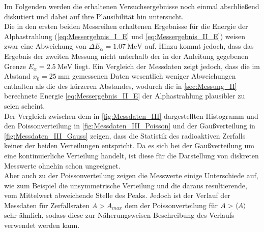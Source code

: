 Im Folgenden werden die erhaltenen Versuchsergebnisse noch einmal
abschließend diskutiert und dabei auf ihre Plausibilität hin untersucht.\\

Die in den ersten beiden Messreihen erhaltenen Ergebnisse für die 
Energie der Alphastrahlung (\cref{eq:Messergebnis_I_E} und \cref{eq:Messergebnis_II_E})
weisen zwar eine Abweichung von $\Delta E_{\alpha} = \SI{1.07}{\mega\eV}$ auf. 
Hinzu kommt jedoch, dass das Ergebnis der zweiten Messung nicht unterhalb der
in der Anleitung \cite{V701} gegebenen Grenze $E_{\alpha} = \SI{2.5}{\mega\eV}$ liegt.
Ein Vergleich der Messdaten zeigt jedoch, dass die im Abstand $x_{0} = \SI{25}{\milli\meter}$ 
gemessenen Daten wesentlich weniger Abweichungen enthalten als die des kürzeren Abstandes,
wodurch die in \cref{sec:Messung_II}  berechnete Energie \cref{eq:Messergebnis_II_E} 
der Alphastrahlung plausibler zu seien scheint. \\

Der Vergleich zwischen dem in \cref{fig:Messdaten_III} dargestellten Histogramm und 
den Poissonverteilung in \cref{fig:Messdaten_III_Poisson} und der Gaußverteilung in
\cref{fig:Messdaten_III_Gauss} zeigen, dass die Statistik des radioaktiven Zerfalls
keiner der beiden Verteilungen entspricht. Da es sich bei der Gaußverteilung um eine 
kontinuierliche Verteilung handelt, ist diese für die Darstellung von diskreten Messwerte
ohnehin schon ungeeignet.\\
Aber auch zu der Poissonverteilung zeigen die Messwerte einige Unterschiede auf,
wie zum Beispiel die unsymmetrische Verteilung und die daraus resultierende,
vom Mittelwert abweichende Stelle des Peaks. Jedoch ist der Verlauf der Messdaten für
Zerfallsraten $A > A_{max}$ dem der Poissonverteilung  für $A > \langle A\rangle$ sehr ähnlich, 
sodass diese zur Näherungsweisen Beschreibung des Verlaufs verwendet werden kann. 